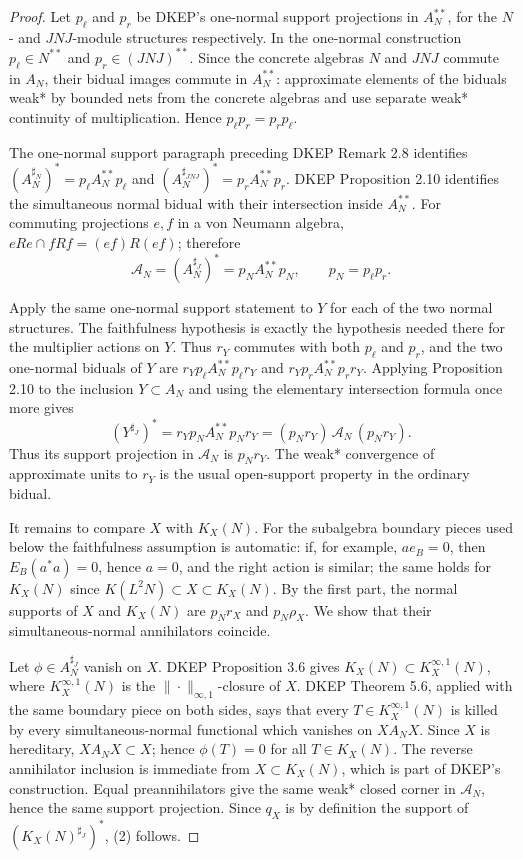 \documentclass[12pt]{article}
\newcommand{\cA}{\mathcal A}
\begin{document}
\begin{proof}
Let \(p_\ell\) and \(p_r\) be DKEP's one-normal support projections in
\(A_N^{**}\), for the \(N\)- and \(JNJ\)-module structures respectively.  In
the one-normal construction \(p_\ell\in N^{**}\) and
\(p_r\in (JNJ)^{**}\).  Since the concrete algebras \(N\) and \(JNJ\) commute
in \(A_N\), their bidual images commute in \(A_N^{**}\): approximate elements
of the biduals weak* by bounded nets from the concrete algebras and use
separate weak* continuity of multiplication.  Hence \(p_\ell p_r=p_rp_\ell\).

The one-normal support paragraph preceding DKEP Remark 2.8 identifies
\((A_N^{\sharp_N})^*=p_\ell A_N^{**}p_\ell\) and
\((A_N^{\sharp_{JNJ}})^*=p_rA_N^{**}p_r\).  DKEP Proposition 2.10 identifies
the simultaneous normal bidual with their intersection inside \(A_N^{**}\).
For commuting projections \(e,f\) in a von Neumann algebra,
\(eRe\cap fRf=(ef)R(ef)\); therefore
\[
        \cA_N=(A_N^{\sharp_J})^*=p_NA_N^{**}p_N,\qquad
        p_N=p_\ell p_r .                                          \tag{3}
\]

Apply the same one-normal support statement to \(Y\) for each of the two
normal structures.  The faithfulness hypothesis is exactly the hypothesis
needed there for the multiplier actions on \(Y\).  Thus \(r_Y\) commutes with
both \(p_\ell\) and \(p_r\), and the two one-normal biduals of \(Y\) are
\(r_Yp_\ell A_N^{**}p_\ell r_Y\) and \(r_Yp_rA_N^{**}p_rr_Y\).  Applying
Proposition 2.10 to the inclusion \(Y\subset A_N\) and using the elementary
intersection formula once more gives
\[
        (Y^{\sharp_J})^*
        = r_Yp_NA_N^{**}p_Nr_Y
        = (p_Nr_Y)\,\cA_N\,(p_Nr_Y).
\]
Thus its support projection in \(\cA_N\) is \(p_Nr_Y\).  The weak* convergence
of approximate units to \(r_Y\) is the usual open-support property in the
ordinary bidual.

It remains to compare \(X\) with \(K_X(N)\).  For the subalgebra boundary
pieces used below the faithfulness assumption is automatic: if, for example,
\(a e_B=0\), then \(E_B(a^*a)=0\), hence \(a=0\), and the right action is
similar; the same holds for \(K_X(N)\) since \(K(L^2N)\subset X\subset K_X(N)\).
By the first part, the normal supports of \(X\) and \(K_X(N)\) are \(p_Nr_X\)
and \(p_N\rho_X\).  We show that their simultaneous-normal annihilators
coincide.

Let \(\phi\in A_N^{\sharp_J}\) vanish on \(X\).  DKEP Proposition 3.6 gives
\(K_X(N)\subset K_X^{\infty,1}(N)\), where \(K_X^{\infty,1}(N)\) is the
\(\|\cdot\|_{\infty,1}\)-closure of \(X\).  DKEP Theorem 5.6, applied with the
same boundary piece on both sides, says that every
\(T\in K_X^{\infty,1}(N)\) is killed by every simultaneous-normal functional
which vanishes on \(X A_N X\).  Since \(X\) is hereditary, \(X A_N X\subset X\);
hence \(\phi(T)=0\) for all \(T\in K_X(N)\).  The reverse annihilator inclusion
is immediate from \(X\subset K_X(N)\), which is part of DKEP's construction.
Equal preannihilators give the same weak* closed corner in \(\cA_N\), hence the
same support projection.  Since \(q_X\) is by definition the support of
\((K_X(N)^{\sharp_J})^*\), (2) follows.
\end{proof}
\end{document}
